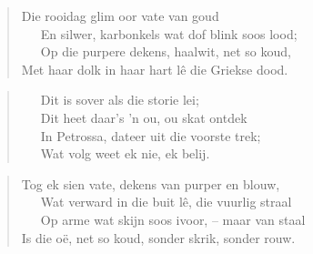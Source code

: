 \begin{verse}
Die rooidag glim oor vate van goud \\ 
\ \ \ En silwer, karbonkels wat dof blink soos lood; \\ 
\ \ \ Op die purpere dekens, haalwit, net so koud, \\ 
Met haar dolk in haar hart lê die Griekse dood. \\ 
\end{verse}

\begin{verse}
\ \ \ Dit is sover als die storie lei; \\ 
\ \ \ Dit heet daar’s ’n ou, ou skat ontdek \\ 
\ \ \ In Petrossa, dateer uit die voorste trek; \\ 
\ \ \ Wat volg weet ek nie, ek belij. \\ 
\end{verse}

\begin{verse}
Tog ek sien vate, dekens van purper en blouw, \\ 
\ \ \ Wat verward in die buit lê, die vuurlig straal \\ 
\ \ \ Op arme wat skijn soos ivoor, -- maar van staal \\ 
Is die o\"e, net so koud, sonder skrik, sonder rouw. \\ 
\end{verse}
